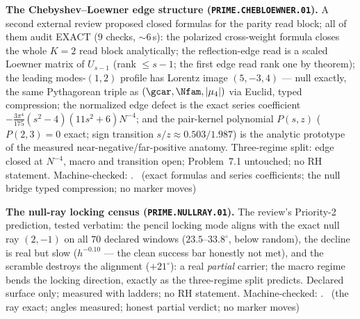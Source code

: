 \par\smallskip\noindent\textbf{The Chebyshev--Loewner edge structure
(\texttt{PRIME.CHEBLOEWNER.01}).}
A second external review proposed closed formulas for the parity read
block; all of them audit EXACT ($9$ checks, ${\sim}6$\,s): the polarized
cross-weight formula closes the whole $K=2$ read block analytically; the
reflection-edge read is a scaled Loewner matrix of $U_{s-1}$ (rank
$\le s-1$; the first edge read rank one by theorem); the leading
modes-$(1,2)$ profile has Lorentz image $(5,-3,4)$ --- null exactly, the
same Pythagorean triple as $(\gcar,\Nfam,|\mu_4|)$ via Euclid, typed
compression; the normalized edge defect is the exact series coefficient
$-\tfrac{3\pi^4}{175}(s^2{-}4)(11s^2{+}6)N^{-4}$; and the pair-kernel
polynomial $P(s,z)$ ($P(2,3)=0$ exact; sign transition
$s/z\approx0.503/1.987$) is the analytic prototype of the measured
near-negative/far-positive anatomy. Three-regime split: edge closed at
$N^{-4}$, macro and transition open; Problem~7.1 untouched; no RH
statement. Machine-checked: .
\mE\ (exact formulas and series coefficients; the null bridge typed
compression; no marker moves)
\par\smallskip


\par\smallskip\noindent\textbf{The null-ray locking census
(\texttt{PRIME.NULLRAY.01}).}
The review's Priority-2 prediction, tested verbatim: the pencil locking
mode aligns with the exact null ray $(2,-1)$ on all $70$ declared windows
($23.5$--$33.8^\circ$, below random), the decline is real but slow
($h^{-0.10}$ --- the clean success bar honestly not met), and the
scramble destroys the alignment ($+21^\circ$): a real \emph{partial}
carrier; the macro regime bends the locking direction, exactly as the
three-regime split predicts. Declared surface only; measured with
ladders; no RH statement. Machine-checked:
.
\mE\ (the ray exact; angles measured; honest partial verdict; no marker
moves)
\par\smallskip


